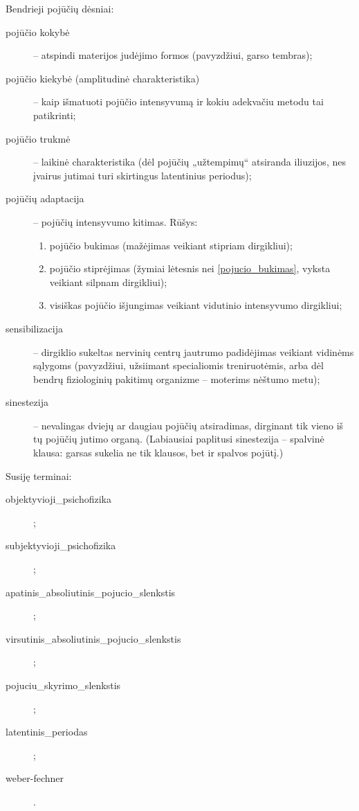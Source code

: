 Bendrieji pojūčių dėsniai:
\begin{description}
  \item[pojūčio kokybė] – atspindi materijos judėjimo formos (pavyzdžiui,
    garso tembras);
  \item[pojūčio kiekybė (amplitudinė charakteristika)] – kaip išmatuoti
    pojūčio intensyvumą ir kokiu adekvačiu metodu tai patikrinti;
  \item[pojūčio trukmė] – laikinė charakteristika (dėl pojūčių „užtempimų“
    atsiranda iliuzijos, nes įvairus jutimai turi skirtingus latentinius
    periodus);
  \item[pojūčių adaptacija] – pojūčių intensyvumo kitimas. Rūšys:
    \begin{enumerate}
      \item \label{pojucio_bukimas} pojūčio bukimas (mažėjimas veikiant 
        stipriam dirgikliui);
      \item pojūčio stiprėjimas (žymiai lėtesnis nei \ref{pojucio_bukimas},
        vyksta veikiant silpnam dirgikliui);
      \item visiškas pojūčio išjungimas veikiant vidutinio intensyvumo
        dirgikliui;
    \end{enumerate}
  \item[sensibilizacija] – dirgiklio sukeltas nervinių centrų jautrumo
    padidėjimas veikiant vidinėms sąlygoms (pavyzdžiui, užsiimant 
    specialiomis treniruotėmis, arba dėl bendrų fiziologinių pakitimų
    organizme – moterims nėštumo metu);
  \item[sinestezija] – nevalingas dviejų ar daugiau pojūčių atsiradimas,
    dirginant tik vieno iš tų pojūčių jutimo organą. (Labiausiai 
    paplitusi sinestezija – spalvinė klausa: garsas sukelia ne tik
    klausos, bet ir spalvos pojūtį.)
\end{description}

Susiję terminai:
\begin{description}
  \item[\gls{objektyvioji_psichofizika}] 
    ;
  \item[\gls{subjektyvioji_psichofizika}] 
    ;
  \item[\gls{apatinis_absoliutinis_pojucio_slenkstis}] 
    ;
  \item[\gls{virsutinis_absoliutinis_pojucio_slenkstis}] 
    ;
  \item[\gls{pojuciu_skyrimo_slenkstis}] 
    ;
  \item[\gls{latentinis_periodas}] 
    ;
  \item[\gls{weber-fechner}] 
    .
\end{description}

